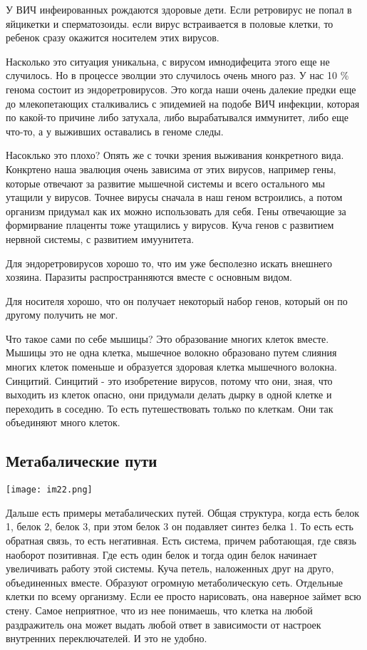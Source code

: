 У ВИЧ инфеированных рождаются здоровые дети. Если ретровирус не попал в яйцикетки и сперматозоиды.
если вирус встраивается в половые клетки, то ребенок сразу окажится носителем этих
вирусов.

Насколько это ситуация уникальна, с вирусом имнодифецита этого еще не случилось. Но
в процессе эволции это случилось очень много раз. У нас 10 \%  генома 
состоит из эндоретровирусов. Это когда наши очень далекие предки еще до млекопетающих 
сталкивались с эпидемией на подобе ВИЧ инфекции, которая по какой-то причине либо затухала, 
либо вырабатывался иммунитет, либо еще что-то, а у выживших 
оставались в геноме следы. 

Насоклько это плохо?
Опять же с точки зрения выживания конкретного вида. Конкртено 
наша эвалюция очень зависима от этих вирусов, например гены, которые 
отвечают за развитие мышечной системы и всего остального мы утащили у вирусов. 
Точнее вирусы сначала в наш геном встроились, а потом организм придумал как их можно 
использовать для себя. Гены отвечающие за формирвание плаценты тоже 
утащились у вирусов. Куча генов с развитием нервной системы, 
с развитием имуунитета. 

Для эндоретровирусов хорошо то, что им уже бесполезно искать внешнего хозяина. 
Паразиты распространняются вместе с основным видом. 

Для носителя хорошо, что он получает некоторый набор генов,
который он по другому получить не мог. 

Что такое сами по себе мышицы? Это образование многих 
клеток вместе. Мышицы это не одна клетка, мышечное 
волокно образовано путем слияния многих клеток поменьше 
и образуется здоровая клетка мышечного волокна. Синцитий. 
Синцитий - это изобретение вирусов, потому что они, зная, 
что выходить из клеток опасно, они придумали делать 
дырку в одной клетке и переходить в соседню. То есть путешествовать только 
по клеткам. Они так объединяют много клеток. 


\subsection{Метабалические пути}
\texttt{[image: im22.png]}

Дальше есть примеры метабалических путей. Общая структура, когда 
есть белок 1, белок 2, белок 3, при этом белок 3 он подавляет синтез белка 1. 
То есть есть обратная связь, то есть негативная. Есть система, причем работающая, 
где связь наоборот позитивная. Где есть один белок и 
тогда один белок начинает увеличивать работу этой системы. Куча петель, наложенных 
друг на друго, объединенных вместе. Образуют огромную метаболическую сеть. Отдельные клетки 
по всему организму. Если ее просто нарисовать, она наверное займет всю стену. Самое 
неприятное, что из нее понимаешь, что клетка на любой раздражитель она может выдать 
любой ответ в зависимости от настроек внутренних переключателей. И это не удобно. 

